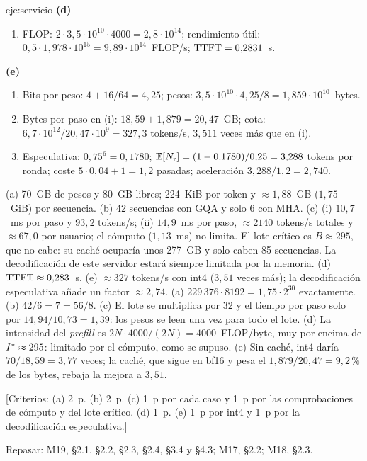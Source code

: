 \begin{solucion}{eje:servicio}
\noindent\textbf{(d)}
\begin{enumerate}[label=\arabic*.]
  \item FLOP: $2\cdot 3{,}5\cdot 10^{10}\cdot 4000=2{,}8\cdot 10^{14}$; rendimiento útil: $0{,}5\cdot 1{,}978\cdot 10^{15}=9{,}89\cdot 10^{14}$~FLOP/s; $\mathrm{TTFT}=0{,}2831$~s.
\end{enumerate}

\noindent\textbf{(e)}
\begin{enumerate}[label=\arabic*.]
  \item Bits por peso: $4+16/64=4{,}25$; pesos: $3{,}5\cdot 10^{10}\cdot 4{,}25/8=1{,}859\cdot 10^{10}$~bytes.
  \item Bytes por paso en (i): $18{,}59+1{,}879=20{,}47$~GB; cota: $6{,}7\cdot 10^{12}/20{,}47\cdot 10^{9}=327{,}3$ tokens/s, $3{,}511$ veces más que en (i).
  \item Especulativa: $0{,}75^{6}=0{,}1780$; $\mathbb{E}[N_{\mathrm{r}}]=(1-0{,}1780)/0{,}25=3{,}288$ tokens por ronda; coste $5\cdot 0{,}04+1=1{,}2$ pasadas; aceleración $3{,}288/1{,}2=2{,}740$.
\end{enumerate}
\resultado (a) 70~GB de pesos y 80~GB libres; 224~KiB por token y $\approx 1{,}88$~GB ($1{,}75$~GiB) por secuencia. (b) 42 secuencias con GQA y solo 6 con MHA. (c) (i) $10{,}7$~ms por paso y $93{,}2$ tokens/s; (ii) $14{,}9$~ms por paso, $\approx 2140$ tokens/s totales y $\approx 67{,}0$ por usuario; el cómputo ($1{,}13$~ms) no limita. El lote crítico es $B\approx 295$, que no cabe: su caché ocuparía unos 277~GB y solo caben 85 secuencias. La decodificación de este servidor estará siempre limitada por la memoria. (d) $\mathrm{TTFT}\approx 0{,}283$~s. (e) $\approx 327$ tokens/s con int4 ($3{,}51$ veces más); la decodificación especulativa añade un factor $\approx 2{,}74$.
\comprobacion (a) $229\,376\cdot 8192=1{,}75\cdot 2^{30}$ exactamente. (b) $42/6=7=56/8$. (c) El lote se multiplica por 32 y el tiempo por paso solo por $14{,}94/10{,}73=1{,}39$: los pesos se leen una vez para todo el lote. (d) La intensidad del \emph{prefill} es $2N\cdot 4000/(2N)=4000$~FLOP/byte, muy por encima de $I^{\ast}\approx 295$: limitado por el cómputo, como se supuso. (e) Sin caché, int4 daría $70/18{,}59=3{,}77$ veces; la caché, que sigue en bf16 y pesa el $1{,}879/20{,}47=9{,}2\,\%$ de los bytes, rebaja la mejora a $3{,}51$.

[Criterios: (a) 2~p. (b) 2~p. (c) 1~p por cada caso y 1~p por las comprobaciones de cómputo y del lote crítico. (d) 1~p. (e) 1~p por int4 y 1~p por la decodificación especulativa.]

Repasar: M19, §2.1, §2.2, §2.3, §2.4, §3.4 y §4.3; M17, §2.2; M18, §2.3.
\end{solucion}

